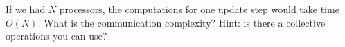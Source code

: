   If we had $N$ processors, the computations for one update step would
  take time~$O(N)$.  What is the communication complexity? Hint: is
  there a collective operations you can use?
